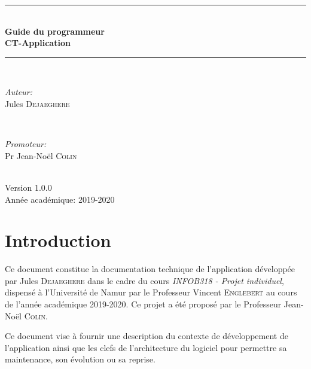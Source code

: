 \documentclass{article}
\begin{document}
\begin{titlepage}

\newcommand{\HRule}{\rule{\linewidth}{0.5mm}} 
\center 
\HRule \\[0.4cm]
{\huge \bfseries Guide du programmeur\\[0.4cm] CT-Application}\\[0.4cm] 
\HRule \\[1.5cm]


\begin{minipage}{0.4\textwidth}
\begin{flushleft} \large
\emph{Auteur:}\\
Jules \textsc{Dejaeghere}
\end{flushleft}
\end{minipage}
~
\begin{minipage}{0.4\textwidth}
\begin{flushright} \large
\emph{Promoteur:} \\
Pr Jean-Noël \textsc{Colin}
\end{flushright}
\end{minipage}\\[2cm]


{\large 
Version 1.0.0\\
\medskip
Année académique: 2019-2020}\\[2cm]


 


\vfill

\end{titlepage}


\tableofcontents

\newpage

\section{Introduction}

Ce document constitue la documentation technique de l'application développée par Jules \textsc{Dejaeghere} dans le cadre du cours \emph{INFOB318 - Projet individuel}, dispensé à l'Université de Namur par le Professeur Vincent \textsc{Englebert} au cours de l'année académique 2019-2020.  Ce projet a été proposé par le Professeur Jean-Noël \textsc{Colin}.

Ce document vise à fournir une description du contexte de développement de l'application ainsi que les clefs de l'architecture du logiciel pour permettre sa maintenance, son évolution ou sa reprise.
\end{document}
